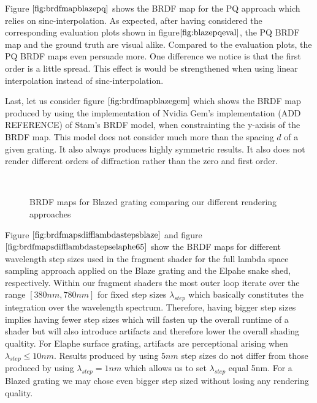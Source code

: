 Figure $\ref{fig:brdfmapblazepq}$ shows the BRDF map for the PQ approach which relies on sinc-interpolation. As expected, after having considered the corresponding evaluation plots shown in figure$\ref{fig:blazepqeval}$, the PQ BRDF map and the ground truth are visual alike. Compared to the evaluation plots, the PQ BRDF maps even persuade more. One difference we notice is that the first order is a little spread. This effect is would be strengthened when using linear interpolation instead of sinc-interpolation.

Last, let us consider figure $\ref{fig:brdfmapblazegem}$ which shows the BRDF map produced by using the implementation of Nvidia Gem's implementation (ADD REFERENCE) of Stam's BRDF model, when constrainting the y-axisis of the BRDF map. This model does not consider much more than the spacing $d$ of a given grating. It also always produces highly symmetric results. It also does not render different orders of diffraction rather than the zero and first order.   

\begin{figure}[H]
  \centering
~
~
~
    
\caption{BRDF maps for Blazed grating comparing our different rendering approaches}
\label{fig:brdfmapsdiffrenderingapproaches}
\end{figure}

Figure $\ref{fig:brdfmapsdifflambdastepsblaze}$ and figure $\ref{fig:brdfmapsdifflambdastepselaphe65}$ show the BRDF maps for different wavelength step sizes used in the fragment shader for the full lambda space sampling approach applied on the Blaze grating and the Elpahe snake shed, respectively. Within our fragment shaders the most outer loop iterate over the range $[380nm, 780nm]$ for fixed step sizes $\lambda_{step}$ which basically constitutes the integration over the wavelength spectrum. Therefore, having bigger step sizes implies having fewer step sizes which will fasten up the overall runtime of a shader but will also introduce artifacts and therefore lower the overall shading qualtity. For Elaphe surface grating, artifacts are perceptional arising when $\lambda_{step} \leq 10nm$. Results produced by using $5nm$ step sizes do not differ from those produced by using $\lambda_{step}= 1nm$ which allows us to set $\lambda_{step}$ equal 5nm. For a Blazed grating we may chose even bigger step sized without losing any rendering quality.   

